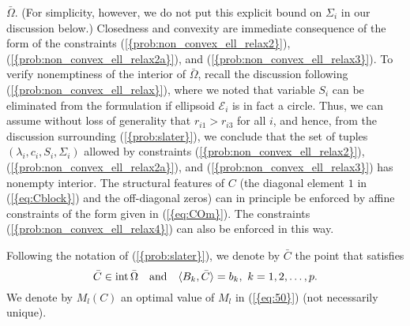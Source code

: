 \documentclass{siamltex}
\begin{document}
$\bar{\Omega}$. (For simplicity, however, we do not put this explicit
bound on $\Sigma_i$ in our discussion below.) Closedness and convexity
are immediate consequence of the form of the constraints
{(\ref{{prob:non_convex_ell_relax2}})},
{(\ref{{prob:non_convex_ell_relax2a}})}, and
{(\ref{{prob:non_convex_ell_relax3}})}. To verify nonemptiness of the
interior of $\bar{\Omega}$, recall the discussion following
{(\ref{{prob:non_convex_ell_relax}})}, where we noted that variable $S_i$
can be eliminated from the formulation if ellipsoid $\mathcal{E}_i$ is
in fact a circle. Thus, we can assume without loss of generality that
$r_{i1}>r_{i3}$ for all $i$, and hence, from the discussion
surrounding {(\ref{{prob:slater}})}, we conclude that the set of tuples
$(\lambda_i,c_i,S_i,\Sigma_i)$ allowed by constraints
{(\ref{{prob:non_convex_ell_relax2}})},
{(\ref{{prob:non_convex_ell_relax2a}})}, and
{(\ref{{prob:non_convex_ell_relax3}})} has nonempty interior.  The
structural features of $C$ (the diagonal element $1$ in {(\ref{{eq:Cblock}})} and
the off-diagonal zeros) can in principle be enforced by affine
constraints of the form given in {(\ref{{eq:COm}})}. The constraints
{(\ref{{prob:non_convex_ell_relax4}})} can also be enforced in this way.

Following the notation of {(\ref{{prob:slater}})}, we denote by $\bar{C}$
the point that satisfies
\begin{equation} \label{eq:Cbar} 
\bar{C} \in {\mbox{\rm int}\,} \bar{\Omega} \quad \mbox{and}
\quad \langle B_k,\bar{C} \rangle = b_k, \ k=1,2,\dotsc,p.  
\end{equation}
We denote by $M_l(C)$ an optimal value of $M_l$ in {(\ref{{eq:50}})} (not
necessarily unique).
\end{document}
